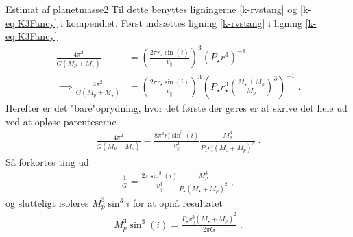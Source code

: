 \begin{opgave}{Estimat af planetmasse}{2}
Til dette benyttes ligningerne \eqref{k-rvstang} og \eqref{k-eq:K3Fancy} i kompendiet. Først indsættes ligning \eqref{k-rvstang} i ligning \eqref{k-eq:K3Fancy}
\begin{align*}
	\frac{4\pi^2}{G(M_p+M_\star )} &= \left(\frac{2\pi r_\star \sin(i)}{v_{||}}\right)^3\left(P_\star r^3\right)^{-1} \\
	\implies \frac{4\pi^2}{G(M_p+M_\star )} &= \left(\frac{2\pi r_\star \sin(i)}{v_{||}}\right)^3\left(P_\star r_\star ^3\left(\frac{M_\star  + M_p}{M_p}\right)^3\right)^{-1}\; .
\end{align*}
Herefter er det "bare"\;oprydning, hvor det første der gøres er at skrive det hele ud ved at opløse parenteserne
\begin{align*}
	\frac{4\pi^2}{G(M_p+M_\star )} = \frac{8\pi^3 r_\star^3 \sin^3(i)}{v_{||}^3} \frac{M_p^3}{P_\star r_\star ^3(M_\star  + M_p)^3} \; .
\end{align*}
Så forkortes ting ud
\begin{align*}
	\frac{1}{G} = \frac{2\pi \sin^3(i)}{v_{||}^3} \frac{M_p^3}{P_\star (M_\star  + M_p)^2} \; ,
\end{align*}
og slutteligt isoleres $M_p^3\sin^3i$ for at opnå resultatet
\begin{align*}
	M_p^3\sin^3(i) = \frac{P_\star v_{||}^3 (M_\star  + M_p)^2}{2\pi G} \; .
\end{align*}
\end{opgave}
%
%
